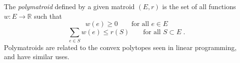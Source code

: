 \documentclass[12pt]{article}
\begin{document}
The \emph{polymatroid} defined by a given matroid $(E,r)$ is the set of
all functions $w:E\to\mathbb{R}$ such that
$$w(e)\ge 0\qquad\text{for all }e\in E$$
$$\sum_{e\in S}w(e)\le r(S)\qquad\text{for all }S\subset E\;.$$
Polymatroids are related to the convex polytopes seen in linear programming,
and have similar uses.
\end{document}
